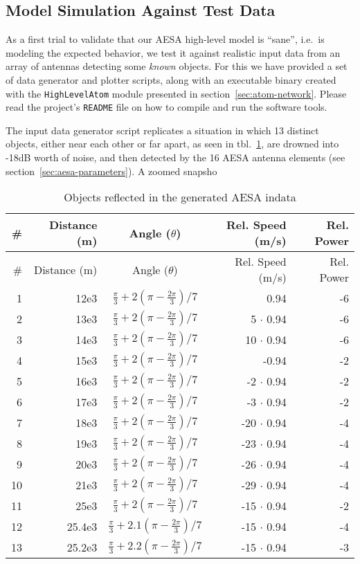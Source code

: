 \documentclass[
  a4paper,
]{article}
\begin{document}
\hypertarget{sec:atom-sim}{%
\subsection{Model Simulation Against Test Data}\label{sec:atom-sim}}

As a first trial to validate that our AESA high-level model is ``sane'',
i.e.~is modeling the expected behavior, we test it against realistic
input data from an array of antennas detecting some \emph{known}
objects. For this we have provided a set of data generator and plotter
scripts, along with an executable binary created with the
\texttt{HighLevelAtom} module presented in
section~\ref{sec:atom-network}. Please read the project's
\texttt{README} file on how to compile and run the software tools.

The input data generator script replicates a situation in which 13
distinct objects, either near each other or far apart, as seen in
tbl.~\ref{tbl:in-objects}, are drowned into -18dB worth of noise, and
then detected by the 16 AESA antenna elements (see
section~\ref{sec:aesa-parameters}). A zoomed snapsho

\hypertarget{tbl:in-objects}{}
\begin{longtable}[]{@{}rrcrr@{}}
\caption{\label{tbl:in-objects}Objects reflected in the generated AESA
indata}\tabularnewline
\toprule
\# & Distance (m) & Angle (\(\theta\)) & Rel. Speed (m/s) & Rel.
Power\tabularnewline
\midrule
\endfirsthead
\toprule
\# & Distance (m) & Angle (\(\theta\)) & Rel. Speed (m/s) & Rel.
Power\tabularnewline
\midrule
\endhead
1 & 12e3 & \(\frac{\pi}{3} + 2(\pi-\frac{2\pi}{3})/7\) & 0.94 &
-6\tabularnewline
2 & 13e3 & \(\frac{\pi}{3} + 2(\pi-\frac{2\pi}{3})/7\) & 5 \(\cdot\)
0.94 & -6\tabularnewline
3 & 14e3 & \(\frac{\pi}{3} + 2(\pi-\frac{2\pi}{3})/7\) & 10 \(\cdot\)
0.94 & -6\tabularnewline
4 & 15e3 & \(\frac{\pi}{3} + 2(\pi-\frac{2\pi}{3})/7\) & -0.94 &
-2\tabularnewline
5 & 16e3 & \(\frac{\pi}{3} + 2(\pi-\frac{2\pi}{3})/7\) & -2 \(\cdot\)
0.94 & -2\tabularnewline
6 & 17e3 & \(\frac{\pi}{3} + 2(\pi-\frac{2\pi}{3})/7\) & -3 \(\cdot\)
0.94 & -2\tabularnewline
7 & 18e3 & \(\frac{\pi}{3} + 2(\pi-\frac{2\pi}{3})/7\) & -20 \(\cdot\)
0.94 & -4\tabularnewline
8 & 19e3 & \(\frac{\pi}{3} + 2(\pi-\frac{2\pi}{3})/7\) & -23 \(\cdot\)
0.94 & -4\tabularnewline
9 & 20e3 & \(\frac{\pi}{3} + 2(\pi-\frac{2\pi}{3})/7\) & -26 \(\cdot\)
0.94 & -4\tabularnewline
10 & 21e3 & \(\frac{\pi}{3} + 2(\pi-\frac{2\pi}{3})/7\) & -29 \(\cdot\)
0.94 & -4\tabularnewline
11 & 25e3 & \(\frac{\pi}{3} + 2(\pi-\frac{2\pi}{3})/7\) & -15 \(\cdot\)
0.94 & -2\tabularnewline
12 & 25.4e3 & \(\frac{\pi}{3} + 2.1(\pi-\frac{2\pi}{3})/7\) & -15
\(\cdot\) 0.94 & -4\tabularnewline
13 & 25.2e3 & \(\frac{\pi}{3} + 2.2(\pi-\frac{2\pi}{3})/7\) & -15
\(\cdot\) 0.94 & -3\tabularnewline
\bottomrule
\end{longtable}
\end{document}
